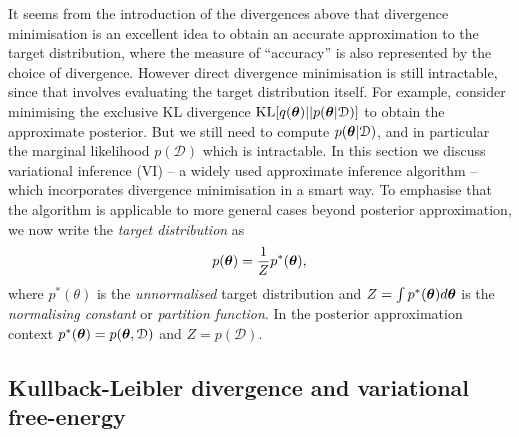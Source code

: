 It seems from the introduction of the divergences above that divergence minimisation is an excellent idea to obtain an accurate approximation to the target distribution, where the measure of ``accuracy'' is also represented by the choice of divergence. However direct divergence minimisation is still intractable, since that involves evaluating the target distribution itself. For example, consider minimising the exclusive KL divergence $\mathrm{KL}[q(\bm{\theta}) || p(\bm{\theta}| \mathcal{D}) ]$ to obtain the approximate posterior. But we still need to compute $p(\bm{\theta}|\mathcal{D})$, and in particular the marginal likelihood $p(\mathcal{D})$ which is intractable. In this section we discuss variational inference (VI) -- a widely used approximate inference algorithm -- which incorporates divergence minimisation in a smart way. To emphasise that the algorithm is applicable to more general cases beyond posterior approximation, we now write the \emph{target distribution} as
\begin{equation*}
p(\bm{\theta}) = \frac{1}{Z} p^*(\bm{\theta}), 
\end{equation*}
where $p^*(\theta)$ is the \emph{unnormalised} target distribution and $Z = \int p^*(\bm{\theta}) d\bm{\theta}$ is the \emph{normalising constant} or \emph{partition function}. In the posterior approximation context $p^*(\bm{\theta}) = p(\bm{\theta}, \mathcal{D})$ and $Z = p(\mathcal{D})$.

\subsection{Kullback-Leibler divergence and variational free-energy}

